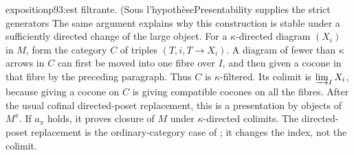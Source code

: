 \begin{dcomment}{exposition}{p93:est filtrante. (Sous l'hypothèse}{Presentability supplies the strict generators}
The same argument explains why this construction is stable under a sufficiently directed change of the large object. For a $\kappa$-directed diagram $(X_i)$ in $M$, form the category $C$ of triples $(T,i,T\to X_i)$. A diagram of fewer than $\kappa$ arrows in $C$ can first be moved into one fibre over $I$, and then given a cocone in that fibre by the preceding paragraph. Thus $C$ is $\kappa$-filtered. Its colimit is $\varinjlim_I X_i$, because giving a cocone on $C$ is giving compatible cocones on all the fibres. After the usual cofinal directed-poset replacement, this is a presentation by objects of $M^\pi$. If $a_\pi$ holds, it proves closure of $M$ under $\kappa$-directed colimits. The directed-poset replacement is the ordinary-category case of \citet[Proposition~5.3.1.18]{Lurie2009HTT}; it changes the index, not the colimit.
\end{dcomment}

